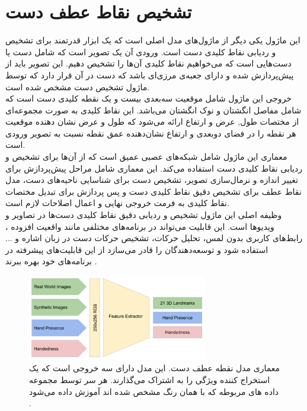 \section{تشخیص نقاط عطف دست\protect{}}
این ماژول یکی دیگر از ماژول‌های مدل اصلی است که یک ابزار قدرتمند برای تشخیص و ردیابی نقاط کلیدی دست است. ورودی آن یک تصویر است که شامل دست یا دست‌هایی 
است که می‌خواهیم نقاط کلیدی آن‌ها را تشخیص دهیم. این تصویر باید از پیش‌پردازش شده و دارای جعبه‌ی مرزی‌ای باشد که دست در آن قرار دارد که توسط ماژول تشخیص دست مشخص شده است.
\\
خروجی این ماژول شامل موقعیت سه‌بعدی بیست و یک نقطه کلیدی دست است که شامل مفاصل انگشتان و نوک انگشتان می‌باشد. این نقاط کلیدی به صورت مجموعه‌ای از مختصات طول, عرض و ارتفاع ارائه می‌شود 
که طول و عرض نشان دهنده موقعیت هر نقطه را در فضای دوبعدی و ارتفاع نشان‌دهنده عمق نقطه نسبت به تصویر ورودی است.
\\
معماری این ماژول شامل  شبکه‌های عصبی عمیق است که از آن‌ها برای تشخیص و ردیابی نقاط کلیدی دست استفاده می‌کند. این معماری شامل مراحل پیش‌پردازش برای تغییر اندازه و نرمال‌سازی تصویر، تشخیص دست برای شناسایی ناحیه‌های دست، مدل 
نقاط عطف برای تشخیص دقیق نقاط کلیدی دست و پس‌ پردازش برای تبدیل مختصات نقاط کلیدی به فرمت خروجی نهایی و اعمال اصلاحات لازم است.
\\
وظیفه اصلی این ماژول تشخیص و ردیابی دقیق نقاط کلیدی دست‌ها در تصاویر و ویدیوها است. این قابلیت می‌تواند در برنامه‌های مختلفی مانند واقعیت افزوده ، رابط‌های کاربری بدون لمس،
تحلیل حرکات، تشخیص حرکات دست در زبان اشاره و ... استفاده شود و توسعه‌دهندگان را قادر می‌سازد از این قابلیت‌های پیشرفته در برنامه‌های خود بهره ببرند \cite{zhang2020mediapipe}.

\begin{figure}[h]
    \centering
    \includegraphics[width=0.7\textwidth]{landmark.png}
    \caption[معماری مدل نقطه عطف دست]{معماری مدل نقطه عطف دست. این مدل دارای سه خروجی است که یک استخراج کننده ویژگی را به اشتراک می‌گذارند. هر سر توسط مجموعه داده های مربوطه که با همان رنگ مشخص شده اند آموزش داده می‌شود \cite{zhang2020mediapipe}.}
\end{figure}

